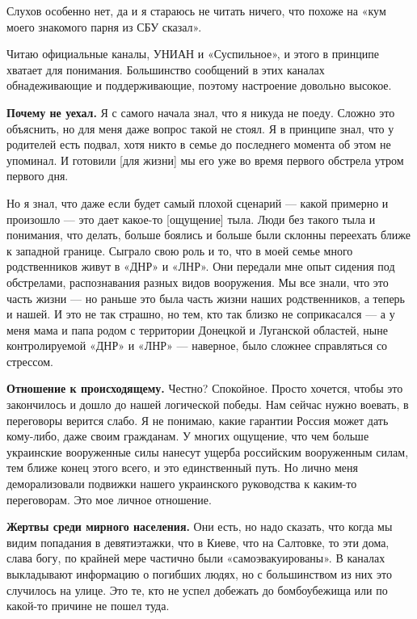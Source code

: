 \begin{fancyquotes}
    Слухов особенно нет, да и я стараюсь не читать ничего, что похоже на «кум моего знакомого парня из СБУ сказал».
\end{fancyquotes}

Читаю официальные каналы, УНИАН и «Суспильное», и этого в принципе хватает для понимания. Большинство сообщений в этих каналах обнадеживающие и поддерживающие, поэтому настроение довольно высокое.

\textbf{Почему не уехал.}
Я с самого начала знал, что я никуда не поеду. Сложно это объяснить, но для меня даже вопрос такой не стоял. Я в принципе знал, что у родителей есть подвал, хотя никто в семье до последнего момента об этом не упоминал. И готовили [для жизни] мы его уже во время первого обстрела утром первого дня.

Но я знал, что даже если будет самый плохой сценарий --- какой примерно и произошло --- это дает какое-то [ощущение] тыла. Люди без такого тыла и понимания, что делать, больше боялись и больше были склонны переехать ближе к западной границе. Сыграло свою роль и то, что в моей семье много родственников живут в «ДНР» и «ЛНР». Они передали мне опыт сидения под обстрелами, распознавания разных видов вооружения. Мы все знали, что это часть жизни --- но раньше это была часть жизни наших родственников, а теперь и нашей. И это не так страшно, но тем, кто так близко не соприкасался --- а у меня мама и папа родом с территории Донецкой и Луганской областей, ныне контролируемой «ДНР» и «ЛНР» --- наверное, было сложнее справляться со стрессом.

\textbf{Отношение к происходящему.} Честно? Спокойное. Просто хочется, чтобы это закончилось и дошло до нашей логической победы. Нам сейчас нужно воевать, в переговоры верится слабо. Я не понимаю, какие гарантии Россия может дать кому-либо, даже своим гражданам. У многих ощущение, что чем больше украинские вооруженные силы нанесут ущерба российским вооруженным силам, тем ближе конец этого всего, и это единственный путь. Но лично меня деморализовали подвижки нашего украинского руководства к каким-то переговорам. Это мое личное отношение.



\textbf{Жертвы среди мирного населения.} Они есть, но надо сказать, что когда мы видим попадания в девятиэтажки, что в Киеве, что на Салтовке, то эти дома, слава богу, по крайней мере частично были «самоэвакуированы». В каналах выкладывают информацию о погибших людях, но с большинством из них это случилось на улице. Это те, кто не успел добежать до бомбоубежища или по какой-то причине не пошел туда.

